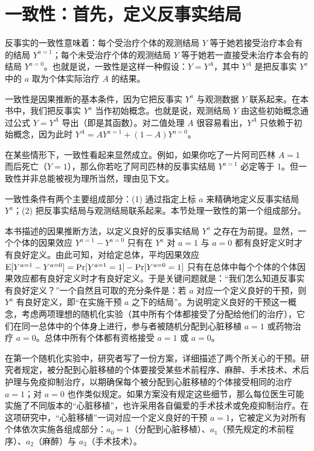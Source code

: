 \section{一致性：首先，定义反事实结局}

反事实的一致性意味着：每个受治疗个体的观测结局 $Y$ 等于她若接受治疗本会有的结局 $Y^{a=1}$；每个未受治疗个体的观测结局 $Y$ 等于她若一直接受未治疗本会有的结局 $Y^{a=0}$。也就是说，一致性是这样一种假设：$Y=Y^{A}$，其中 $Y^{A}$ 是把反事实 $Y^{a}$ 中的 $a$ 取为个体实际治疗 $A$ 的结果。

一致性是因果推断的基本条件，因为它把反事实 $Y^{a}$ 与观测数据 $Y$ 联系起来。在本书中，我们把反事实 $Y^{a}$ 当作初始概念。也就是说，观测结局 $Y$ 由这些初始概念通过公式 $Y=Y^{A}$ 导出（即是其函数）。对二值处理 $A$ 很容易看出，$Y^{A}$ 只依赖于初始概念，因为此时 $Y^{A}=AY^{a=1}+(1-A)Y^{a=0}$。


在某些情形下，一致性看起来显然成立。例如，如果你吃了一片阿司匹林 $A=1$ 而后死亡（$Y=1$），那么你若吃了阿司匹林的反事实结局 $Y^{a=1}$ 必定等于 1。但一致性并非总能被视为理所当然，理由见下文。

一致性条件有两个主要组成部分：(1) 通过指定上标 $a$ 来精确地定义反事实结局 $Y^{a}$；(2) 把反事实结局与观测结局联系起来。本节处理一致性的第一个组成部分。

本书描述的因果推断方法，以定义良好的反事实结局 $Y^{a}$ 之存在为前提。显然，一个个体的因果效应 $Y^{a=1}-Y^{a=0}$ 只有在 $Y^{a}$ 对 $a=1$ 与 $a=0$ 都有良好定义时才有良好定义。由此可知，对给定总体，平均因果效应 $\mathrm{E}[Y^{a=1}-Y^{a=0}]=\Pr[Y^{a=1}=1]-\Pr[Y^{a=0}=1]$ 只有在总体中每个个体的个体因果效应都有良好定义时才有良好定义。于是关键问题就是：“我们怎么知道反事实有良好定义？”一个自然且可取的充分条件是：若 $a$ 对应一个定义良好的干预，则 $Y^{a}$ 有良好定义，即“在实施干预 $a$ 之下的结局”。为说明定义良好的干预这一概念，考虑两项理想的随机化实验（其中所有个体都接受了分配给他们的治疗），它们在同一总体中的个体身上进行，参与者被随机分配到心脏移植 $a=1$ 或药物治疗 $a=0$。总体中所有个体都有资格接受 $a=1$ 或 $a=0$。

在第一个随机化实验中，研究者写了一份方案，详细描述了两个所关心的干预。研究者规定，被分配到心脏移植的个体要接受某些术前程序、麻醉、手术技术、术后护理与免疫抑制治疗，以期确保每个被分配到心脏移植的个体接受相同的治疗 $a=1$；对 $a=0$ 也作类似规定。如果方案没有规定这些细节，那么每位医生可能实施了不同版本的“心脏移植”，也许采用各自偏爱的手术技术或免疫抑制治疗。在这项研究中，“心脏移植”一词对应一个定义良好的干预 $a=1$，它被定义为对所有个体依次实施各组成部分：$a_0=1$（分配到心脏移植）、$a_1$（预先规定的术前程序）、$a_2$（麻醉）与 $a_3$（手术技术）。

